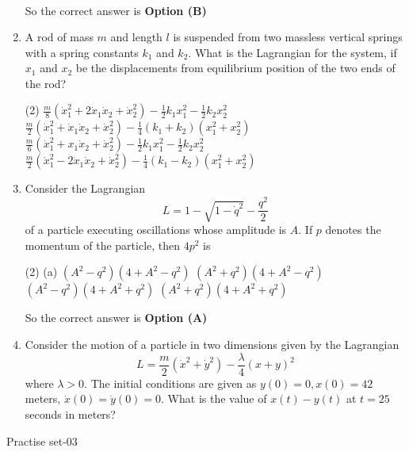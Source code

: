 \begin{enumerate}
\begin{answer}
\begin{align*}
		\end{align*}
		So the correct answer is \textbf{Option (B)}
	\end{answer}	
	\item  A rod of mass $m$ and length $l$ is suspended from two massless vertical springs with a spring constants $k_{1}$ and $k_{2} .$ What is the Lagrangian for the system, if $x_{1}$ and $x_{2}$ be the displacements from equilibrium position of the two ends of the rod?
	{}
	\begin{tasks}(2)
		\task[\textbf{A.}] $\frac{m}{8}\left(\dot{x}_{1}^{2}+2 \dot{x}_{1} \dot{x}_{2}+\dot{x}_{2}^{2}\right)-\frac{1}{2} k_{1} x_{1}^{2}-\frac{1}{2} k_{2} x_{2}^{2}$
		\task[\textbf{B.}] $\frac{m}{2}\left(\dot{x}_{1}^{2}+\dot{x}_{1} \dot{x}_{2}+\dot{x}_{2}^{2}\right)-\frac{1}{4}\left(k_{1}+k_{2}\right)\left(x_{1}^{2}+x_{2}^{2}\right)$
		\task[\textbf{C.}] $\frac{m}{6}\left(\dot{x}_{1}^{2}+x_{1} \dot{x}_{2}+\dot{x}_{2}^{2}\right)-\frac{1}{2} k_{1} x_{1}^{2}-\frac{1}{2} k_{2} x_{2}^{2}$
		\task[\textbf{D.}] $\frac{m}{2}\left(\dot{x}_{1}^{2}-2 \dot{x}_{1} \dot{x}_{2}+\dot{x}_{2}^{2}\right)-\frac{1}{4}\left(k_{1}-k_{2}\right)\left(x_{1}^{2}+x_{2}^{2}\right)$
	\end{tasks}
	\item Consider the Lagrangian
	$$L=1-\sqrt{1-\dot{q}^{2}}-\frac{q^{2}}{2}$$
	of a particle executing oscillations whose amplitude is $A$. If $p$ denotes the momentum of the particle, then $4 p^{2}$ is
	{}
	\begin{tasks}(2)
		\task[\textbf{A.}] (a) $\left(A^{2}-q^{2}\right)\left(4+A^{2}-q^{2}\right)$
		\task[\textbf{B.}] $\left(A^{2}+q^{2}\right)\left(4+A^{2}-q^{2}\right)$
		\task[\textbf{C.}] $\left(A^{2}-q^{2}\right)\left(4+A^{2}+q^{2}\right)$
		\task[\textbf{D.}] $\left(A^{2}+q^{2}\right)\left(4+A^{2}+q^{2}\right)$
	\end{tasks}
	\begin{answer}
		So the correct answer is \textbf{Option (A)}
	\end{answer}	
	\item Consider the motion of a particle in two dimensions given by the Lagrangian $$L=\frac{m}{2}\left(\dot{x}^{2}+\dot{y}^{2}\right)-\frac{\lambda}{4}(x+y)^{2}$$
	where $\lambda>0$. The initial conditions are given as $y(0)=0, x(0)=42$ meters, $\dot{x}(0)=\dot{y}(0)=0$. What is the value of $x(t)-y(t)$ at $t=25$ seconds in meters?
	{}
\end{enumerate}
\newpage
\begin{abox}
	Practise set-03
\end{abox}
